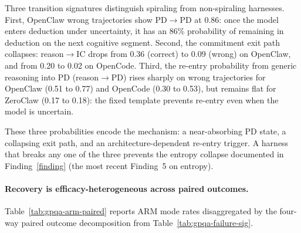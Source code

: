 Three transition signatures distinguish spiraling from non-spiraling harnesses.
First, OpenClaw wrong trajectories show PD$\to$PD at 0.86: once the model enters
deduction under uncertainty, it has an 86\% probability of remaining in
deduction on the next cognitive segment.
Second, the commitment exit path collapses: reason$\to$IC drops from 0.36
(correct) to 0.09 (wrong) on OpenClaw, and from 0.20 to 0.02 on OpenCode.
Third, the re-entry probability from generic reasoning into PD (reason$\to$PD)
rises sharply on wrong trajectories for OpenClaw (0.51 to 0.77) and OpenCode
(0.30 to 0.53), but remains flat for ZeroClaw (0.17 to 0.18): the fixed
template prevents re-entry even when the model is uncertain.

These three probabilities encode the mechanism: a near-absorbing PD state, a
collapsing exit path, and an architecture-dependent re-entry trigger.
A harness that breaks any one of the three prevents the entropy collapse
documented in Finding~\ref{finding} (the most recent Finding~5 on entropy).

\paragraph{Recovery is efficacy-heterogeneous across paired outcomes.}

Table~\ref{tab:gpqa-arm-paired} reports ARM mode rates disaggregated by the
four-way paired outcome decomposition from Table~\ref{tab:gpqa-failure-sig}.

